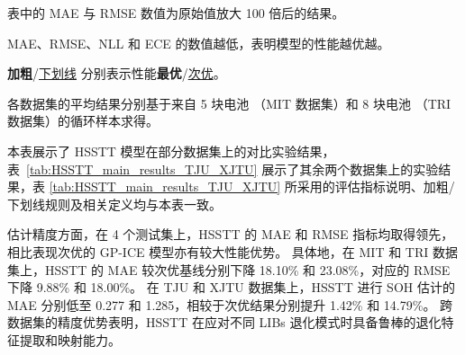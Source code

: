 \begin{table}[htbp]
\begin{threeparttable}
\begin{tabularx}{\textwidth}
    \end{tabularx}
    \begin{tablenotes}
        \item[a] 表中的 MAE 与 RMSE 数值为原始值放大 100 倍后的结果。
        \item[b] MAE、RMSE、NLL 和 ECE 的数值越低，表明模型的性能越优越。
        \item[c] \textbf{加粗}/\underline{下划线} 分别表示性能\textbf{最优}/\underline{次优}。
        \item[d] 各数据集的平均结果分别基于来自 5 块电池 （MIT 数据集）和 8 块电池 （TRI 数据集）的循环样本求得。
        \item[e] 本表展示了 HSSTT 模型在部分数据集上的对比实验结果，表~\ref{tab:HSSTT_main_results_TJU_XJTU} 展示了其余两个数据集上的实验结果，表 \ref{tab:HSSTT_main_results_TJU_XJTU} 所采用的评估指标说明、加粗/下划线规则及相关定义均与本表一致。
    \end{tablenotes}
  \end{threeparttable}
\end{table}

估计精度方面，在 4 个测试集上，HSSTT 的 MAE 和 RMSE 指标均取得领先，相比表现次优的 GP-ICE 模型亦有较大性能优势。
具体地，在 MIT 和 TRI 数据集上，HSSTT 的 MAE 较次优基线分别下降 18.10\% 和 23.08\%，对应的 RMSE 下降 9.88\% 和 18.00\%。
在 TJU 和 XJTU 数据集上，HSSTT 进行 SOH 估计的 MAE 分别低至 0.277 和 1.285，相较于次优结果分别提升 1.42\% 和 14.79\%。
跨数据集的精度优势表明，HSSTT 在应对不同 LIBs 退化模式时具备鲁棒的退化特征提取和映射能力。

